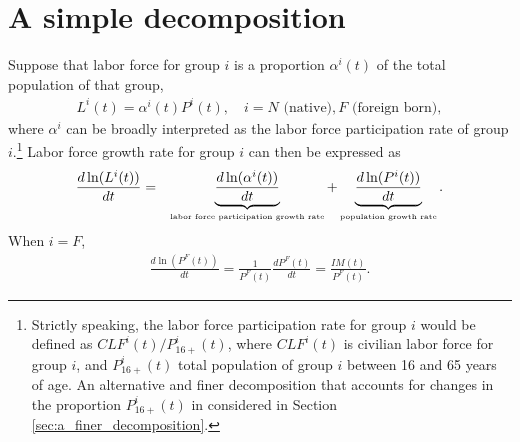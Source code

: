 \documentclass[
    abstract=true,
    11pt,
    letterpaper,
    oneside,
    headinclude,
    footinclude,
    BCOR=5mm,
]{scrartcl}
\begin{document}

%




\section{A simple decomposition}

Suppose that labor force for group $i$ is a proportion $\alpha^i(t)$ of the total population of that group,
\begin{eqnarray}
L^i(t) = \alpha^i(t) P^i(t), \quad i = N \mbox{ (native)}, F \mbox{ (foreign born)}, \nonumber
\end{eqnarray}
where $\alpha^i$ can be broadly interpreted as the labor force participation rate of group $i$.\footnote{Strictly speaking, the labor force participation rate for group $i$ would be defined as $CLF^i(t)/P_{16+}^i(t)$, where $CLF^i(t)$ is civilian labor force for group $i$, and $P_{16+}^i(t)$ total population of group $i$ between 16 and 65 years of age. An alternative and finer decomposition that accounts for changes in the proportion $P_{16+}^i(t)$ in considered in Section \ref{sec:a_finer_decomposition}.} Labor force growth rate for group $i$ can then be expressed as
\begin{eqnarray}
\frac{d \ln(L^i(t))}{dt} &=& \underbrace{\frac{d \ln(\alpha^i(t))}{dt}}_{\mbox{\tiny labor force participation growth rate}} + \underbrace{\frac{d \ln(P^i(t))}{dt}}_{\mbox{\tiny population growth rate}} \nonumber.
\end{eqnarray}
When $i = F$,
\begin{eqnarray}
\frac{d \ln(P^{F}(t))}{dt} = \frac{1}{P^{F}(t)} \frac{d P^{F}(t)}{dt} = \frac{IM(t)}{P^{F}(t)}. \nonumber
\end{eqnarray}
\end{document}
